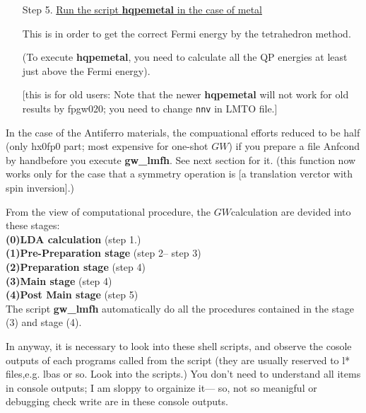 \documentclass[a4paper,10pt,epsf,fleqn]{article}
\newcommand{\GW}{$GW$}
\newcommand{\io}[1]{{\sf  #1}}
\begin{document}
\begin{enumerate}
\item[Step 5.]
\underline{\large Run the script {\bf hqpemetal} in the case of metal}

This is in order to get the correct Fermi energy by the tetrahedron method.

(To execute {\bf hqpemetal}, you need to calculate all the QP energies 
at least just above the Fermi energy).

[this is for old users: Note that the newer {\bf hqpemetal} will not work for old results by fpgw020;
you need to change \verb#nnv# in {\sf LMTO} file.]
\end{enumerate}

\vspace{2mm}

In the case of the Antiferro materials, the compuational efforts reduced to be half 
(only hx0fp0 part; most expensive for one-shot $GW$) if you prepare a file {\sf Anfcond} 
by handbefore you execute {\bf gw\_lmfh}. See next section for it.
(this function now works only for the case that 
a symmetry operation is [a translation verctor with spin inversion].)

\vspace{2mm}


From the view of computational procedure,
the \GW calculation are devided into these stages: \\
{\bf (0)LDA calculation }(step 1.)\\
{\bf (1)Pre-Preparation stage} (step 2-- step 3)\\
{\bf (2)Preparation stage} (step 4) \\
{\bf (3)Main stage} (step 4)\\
{\bf (4)Post Main stage} (step 5)\\
The script {\bf gw\_lmfh} automatically do all the procedures 
contained in the stage (3) and stage (4).

In anyway, it is necessary to look into these shell scripts, 
and observe the cosole outputs of each programs called from the script 
(they are usually reserved to \io{l*} files,e.g. \io{lbas} or so. 
Look into the scripts.) You don't need to understand all items in console outputs;
I am sloppy to orgainize it--- so, not so meanigful or debugging check write are 
in these console outputs.
\end{document}
